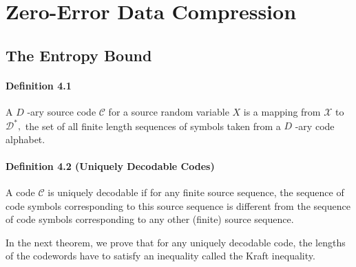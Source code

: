 \documentclass[8pt]{article}
\begin{document}

\section{Zero-Error Data Compression}
\subsection{The Entropy Bound}
\paragraph{Definition 4.1} A $D$ -ary source code $\mathcal{C}$ for a source random variable $X$ is a mapping from $\mathcal{X}$ to $\mathcal{D}^{*},$ the set of all finite length sequences of symbols taken from a $D$ -ary code alphabet.

\begin{tcolorbox}
\paragraph{Definition 4.2 (Uniquely Decodable Codes)} A code $\mathcal{C}$ is uniquely decodable if for any finite source sequence, the sequence of code symbols corresponding to this source sequence is different from the sequence of code symbols corresponding to any other (finite) source
sequence.
\end{tcolorbox}

In the next theorem, we prove that for any uniquely decodable code,
the lengths of the codewords have to satisfy an inequality called the Kraft
inequality.
\end{document}
